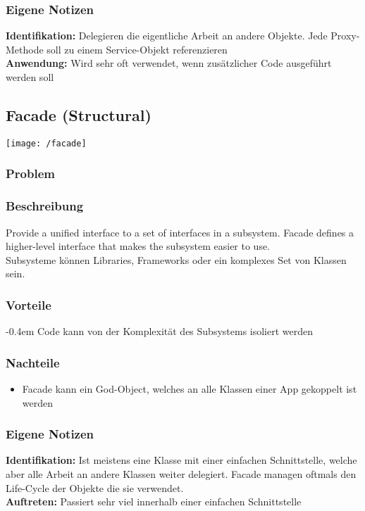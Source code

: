 \subsubsection{Eigene Notizen}
\textbf{Identifikation:} Delegieren die eigentliche Arbeit an andere Objekte. Jede Proxy-Methode soll zu einem Service-Objekt referenzieren\\
\textbf{Anwendung:} Wird sehr oft verwendet, wenn zusätzlicher Code ausgeführt werden soll

\subsection{Facade (Structural)}
\texttt{[image: /facade]}
\subsubsection{Problem}

\subsubsection{Beschreibung}
Provide a unified interface to a set of interfaces in a subsystem. Facade defines a higher-level interface that makes the subsystem easier to use.\\
Subsysteme können Libraries, Frameworks oder ein komplexes Set von Klassen sein.
\subsubsection{Vorteile}
\begin{itemize}[topsep=0pt]
    \itemsep -0.4em
    \itemDer Code kann von der Komplexität des Subsystems isoliert werden
\end{itemize}
\subsubsection{Nachteile}
\begin{itemize}[topsep=0pt]
    \itemsep -0.4em
    \item Facade kann ein God-Object, welches an alle Klassen einer App gekoppelt ist werden
\end{itemize}
\subsubsection{Eigene Notizen}

\textbf{Identifikation:} Ist meistens eine Klasse mit einer einfachen Schnittstelle, welche aber alle Arbeit an andere Klassen weiter delegiert. Facade managen oftmals den Life-Cycle der Objekte die sie verwendet.\\
\textbf{Auftreten:} Passiert sehr viel innerhalb einer einfachen Schnittstelle


